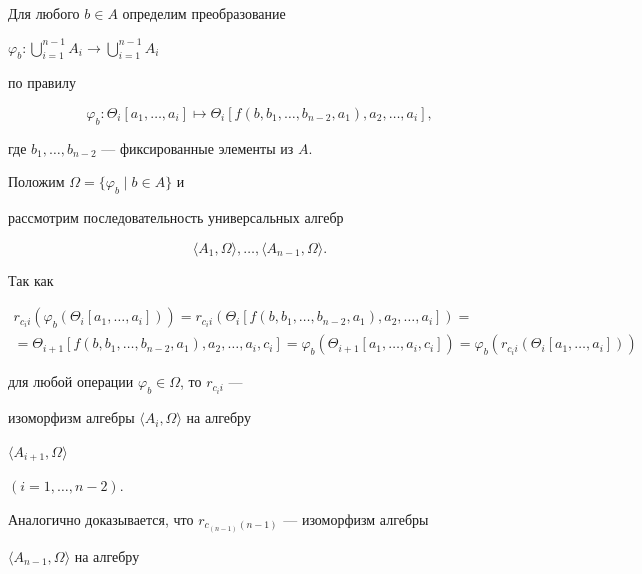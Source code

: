 \begin{pf}


Для любого $b\in A$ определим преобразование


$\varphi_b :\bigcup\limits_{i=1}^{n-1}A_i\to\bigcup\limits_{i=1}^{n-1}A_i$


по правилу


$$


\varphi_b : \Theta_i[a_1,\dotsc, a_i]\mapsto\Theta_i[f(b, b_1,\dotsc, b_{n-2},


a_1), a_2,\dotsc, a_i],


$$


где $b_1,\dotsc,b_{n-2}$ --- фиксированные элементы из $A$.


Положим $\Omega = \{\varphi_b \mid b\in A\}$ и


рассмотрим последовательность универсальных алгебр


\begin{equation}


\langle A_1, \Omega \rangle ,\dotsc,\langle A_{n-1}, \Omega\rangle .


\end{equation}


Так как


\begin{multline*}


r_{c_ii}(\varphi_b (\Theta_i[a_1,\dotsc,a_i])) =


r_{c_ii}(\Theta_i[f(b, b_1,\dotsc, b_{n-2}, a_1), a_2,\dotsc, a_i]) = \\


%


= \Theta_{i+1}[f(b, b_1,\dotsc, b_{n-2}, a_1), a_2,\dotsc, a_i, c_i] =


\varphi_b(\Theta_{i+1}[a_1,\dotsc, a_i, c_i]) =


\varphi_b(r_{c_ii}(\Theta_i[a_1,\dotsc, a_i]))


\end{multline*}


для любой операции $\varphi_b\in \Omega$, то $r_{c_ii}$ ---


изоморфизм алгебры $\langle  A_i, \Omega \rangle $ на алгебру


$\langle  A_{i+1}, \Omega \rangle $


$(i = 1, \dotsc, n-2)$.





Аналогично доказывается, что $r_{c_{(n-1)}(n-1)}$ --- изоморфизм алгебры


${\langle A_{n-1}, \Omega \rangle }$ на алгебру



\end{pf}
